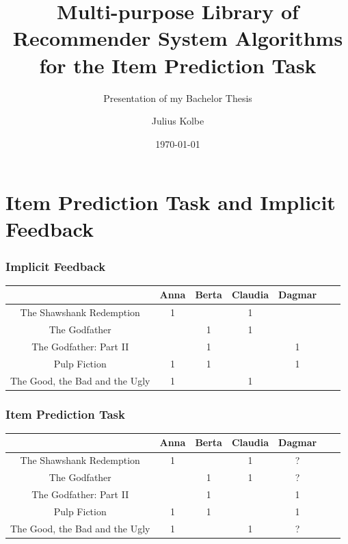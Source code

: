 \documentclass[mathserif,svgnames]{beamer}
\title[Library of Recommender System Algorithms]
{Multi-purpose Library of Recommender System Algorithms for the Item Prediction Task}
\subtitle{Presentation of my Bachelor Thesis}
\author{Julius Kolbe}
\date{\today}
\institute{\large{L3S Research Center / Leibniz University of Hanover\\ Hanover, Germany}}
\begin{document}
\frame{\titlepage} %

\section{Item Prediction Task and Implicit Feedback}
\begin{frame}
\frametitle{Implicit Feedback}

\begin{table}[t]
\begin{tabular}{c|cccccc}
    &Anna&Berta&Claudia&Dagmar\\\hline
    The Shawshank Redemption&1&&1&\\
    The Godfather&&1&1&\\
    The Godfather: Part II&&1&&1\\
    Pulp Fiction&1&1&&1\\
    The Good, the Bad and the Ugly&1&&1&\\
\end{tabular}
\end{table}
\end{frame}
\begin{frame}
\frametitle{Item Prediction Task}

\begin{table}[t]
\begin{tabular}{c|cccccc}
    &Anna&Berta&Claudia&Dagmar\\\hline
    The Shawshank Redemption&1&&1&?\\
    The Godfather&&1&1&?\\
    The Godfather: Part II&&1&&1\\
    Pulp Fiction&1&1&&1\\
    The Good, the Bad and the Ugly&1&&1&?\\
\end{tabular}
\end{table}

\end{frame}
\end{document}
